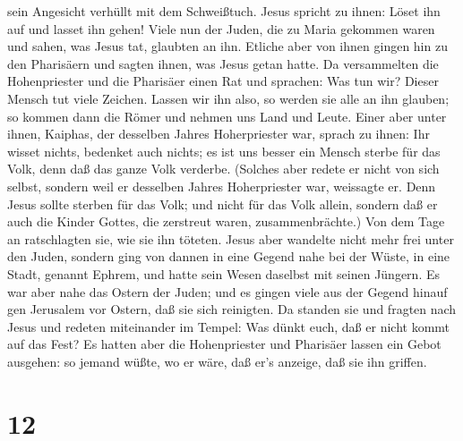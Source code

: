 sein Angesicht verhüllt mit dem Schweißtuch. Jesus spricht zu ihnen:
Löset ihn auf und lasset ihn gehen!  Viele nun der Juden,
die zu Maria gekommen waren und sahen, was Jesus tat, glaubten an ihn.
 Etliche aber von ihnen gingen hin zu den Pharisäern und
sagten ihnen, was Jesus getan hatte.  Da versammelten die
Hohenpriester und die Pharisäer einen Rat und sprachen: Was tun wir?
Dieser Mensch tut viele Zeichen.  Lassen wir ihn also, so
werden sie alle an ihn glauben; so kommen dann die Römer und nehmen uns
Land und Leute.  Einer aber unter ihnen, Kaiphas, der
desselben Jahres Hoherpriester war, sprach zu ihnen: Ihr wisset nichts,
 bedenket auch nichts; es ist uns besser ein Mensch sterbe
für das Volk, denn daß das ganze Volk verderbe.  (Solches
aber redete er nicht von sich selbst, sondern weil er desselben Jahres
Hoherpriester war, weissagte er. Denn Jesus sollte sterben für das Volk;
 und nicht für das Volk allein, sondern daß er auch die
Kinder Gottes, die zerstreut waren, zusammenbrächte.)  Von
dem Tage an ratschlagten sie, wie sie ihn töteten.  Jesus
aber wandelte nicht mehr frei unter den Juden, sondern ging von dannen
in eine Gegend nahe bei der Wüste, in eine Stadt, genannt Ephrem, und
hatte sein Wesen daselbst mit seinen Jüngern.  Es war aber
nahe das Ostern der Juden; und es gingen viele aus der Gegend hinauf gen
Jerusalem vor Ostern, daß sie sich reinigten.  Da standen
sie und fragten nach Jesus und redeten miteinander im Tempel: Was dünkt
euch, daß er nicht kommt auf das Fest?  Es hatten aber die
Hohenpriester und Pharisäer lassen ein Gebot ausgehen: so jemand wüßte,
wo er wäre, daß er's anzeige, daß sie ihn griffen.

\hypertarget{section-11}{%
\section{12}\label{section-11}}

